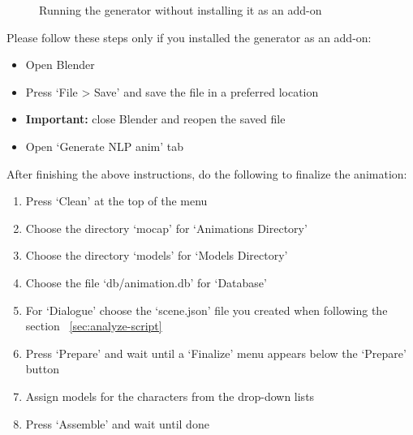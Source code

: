 \begin{figure}[H]
	\centerline{}
	\caption{Running the generator without installing it as an add-on}\label{fig:withoutaddon}
\end{figure}

Please follow these steps only if you installed the generator as an add-on:
\begin{itemize}
	\item Open Blender
	\item Press `File > Save' and save the file in a preferred location
	\item \textbf{Important:} close Blender and reopen the saved file
	\item Open `Generate NLP anim' tab
\end{itemize}

\noindent After finishing the above instructions, do the following to finalize the animation:
\begin{enumerate}
	\item Press `Clean' at the top of the menu
	\item Choose the directory `mocap' for `Animations Directory'
	\item Choose the directory `models' for `Models Directory'
	\item Choose the file `db/animation.db' for `Database'
	\item For `Dialogue' choose the `scene.json' file you created when following the section ~\ref{sec:analyze-script}
	\item Press `Prepare' and wait until a `Finalize' menu appears below the `Prepare' button
	\item Assign models for the characters from the drop-down lists
	\item Press `Assemble' and wait until done
\end{enumerate}

